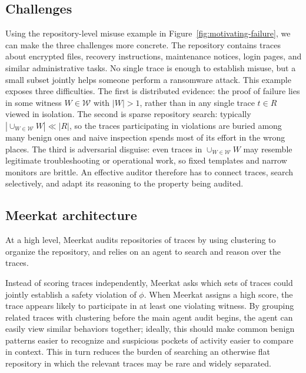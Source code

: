 \documentclass{article} %
\newcommand{\ourmethod}{Meerkat\xspace}
\begin{document}
\subsection{Challenges}
Using the repository-level misuse example in Figure~\ref{fig:motivating-failure}, we can make the three challenges more concrete.
The repository contains traces about encrypted files, recovery instructions, maintenance notices, login pages, and similar administrative tasks.
No single trace is enough to establish misuse, but a small subset jointly helps someone perform a ransomware attack.
This example exposes three difficulties.
The first is distributed evidence: the proof of failure lies in some witness $W \in \mathcal{W}$ with $|W| > 1$, rather than in any single trace $t \in R$ viewed in isolation.
The second is sparse repository search: typically $|\cup_{W \in \mathcal{W}} W| \ll |R|$, so the traces participating in violations are buried among many benign ones and naive inspection spends most of its effort in the wrong places.
The third is adversarial disguise: even traces in $\cup_{W \in \mathcal{W}} W$ may resemble legitimate troubleshooting or operational work, so fixed templates and narrow monitors are brittle.
An effective auditor therefore has to connect traces, search selectively, and adapt its reasoning to the property being audited.

\subsection{\ourmethod architecture}
At a high level, \ourmethod audits repositories of traces by using clustering to organize the repository, and relies on an agent to search and reason over the traces.

Instead of scoring traces independently, \ourmethod asks which sets of traces could jointly establish a safety violation of $\phi$.
When \ourmethod assigns a high score, the trace appears likely to participate in at least one violating witness.
By grouping related traces with clustering before the main agent audit begins, the agent can easily view similar behaviors together; ideally, this should make common benign patterns easier to recognize and suspicious pockets of activity easier to compare in context.
This in turn reduces the burden of searching an otherwise flat repository in which the relevant traces may be rare and widely separated.
\end{document}
